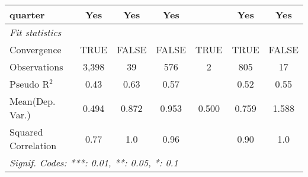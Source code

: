 \begin{tabular}{lcccccc}
   quarter                                                    & Yes           & Yes            & Yes           &      & Yes           & Yes\\  
   \midrule
   \emph{Fit statistics}\\
   Convergence                                                &TRUE           & FALSE          & FALSE         & TRUE & TRUE          & FALSE\\  
   Observations                                               & 3,398         & 39             & 576           & 2    & 805           & 17\\  
   Pseudo R$^2$                                               & 0.43          & 0.63           & 0.57          &      & 0.52          & 0.55\\  
Mean(Dep. Var.) & 0.494 & 0.872 & 0.953 & 0.500 & 0.759 & 1.588 \\
   Squared Correlation                                        & 0.77          & 1.0            & 0.96          &      & 0.90          & 1.0\\  
   \midrule \midrule
   \multicolumn{7}{l}{\emph{Signif. Codes: ***: 0.01, **: 0.05, *: 0.1}}\\
\end{tabular}
\par\endgroup
